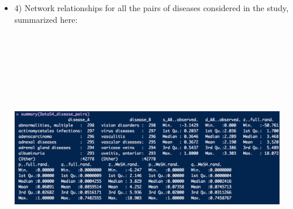 \documentclass[11pt, oneside]{article}   	%
\begin{document}
\begin{itemize}
\item 4) Network relationships for all the pairs of diseases considered in the study, summarized here: \\
\includegraphics[width=12cm,height=12cm,keepaspectratio]{S4_summ.png}

\end{itemize}
\end{document}
